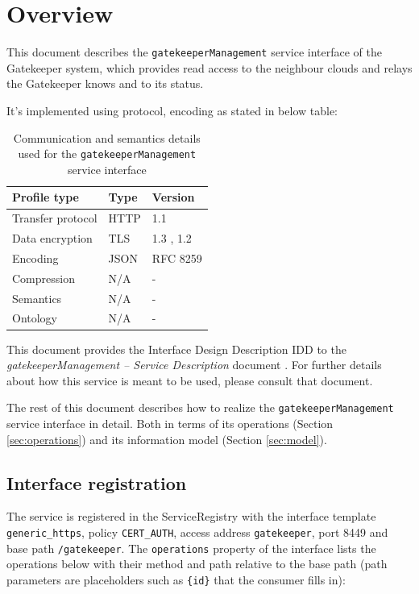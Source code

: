 \documentclass[a4paper]{arrowhead}
\begin{document}
\section{Overview}
\label{sec:overview}

This document describes the \texttt{gatekeeper\allowbreak{}Management} service interface of the Gatekeeper system, which provides read access to the neighbour clouds and relays the Gatekeeper knows and to its status.

It's implemented using protocol, encoding as stated in below table:
\begin{table}[ht!]
  \centering
  \begin{tabular}{|l|l|l|}
    \hline
    \rowcolor{gray!33} Profile type & Type & Version \\ \hline
    Transfer protocol & HTTP & 1.1 \cite{rfc9112} \\ \hline
    Data encryption & TLS & 1.3 \cite{rfc8446}, 1.2 \cite{rfc5246} \\ \hline
    Encoding & JSON & RFC 8259 \cite{rfc8259} \\ \hline
    Compression & N/A & - \\ \hline
    Semantics & N/A & - \\ \hline
    Ontology & N/A & - \\ \hline
  \end{tabular}
  \caption{Communication and semantics details used for the \texttt{gatekeeper\allowbreak{}Management} service interface}
  \label{tab:comunication_semantics_profile}
\end{table}

This document provides the Interface Design Description IDD to the \textit{gatekeeperManagement -- Service Description} document \cite{gk-gatekeeperManagement-sd}.
For further details about how this service is meant to be used, please consult that document.

The rest of this document describes how to realize the \texttt{gatekeeper\allowbreak{}Management} service
interface in detail. Both in terms of its operations (Section \ref{sec:operations}) and its information model (Section \ref{sec:model}).

\subsection{Interface registration}

The service is registered in the ServiceRegistry with the interface template \texttt{generic\_\allowbreak{}https}, policy \texttt{CERT\_\allowbreak{}AUTH}, access address \texttt{gatekeeper}, port 8449 and base path \texttt{/\allowbreak{}gatekeeper}. The \texttt{operations} property of the interface lists the operations below with their method and path relative to the base path (path parameters are placeholders such as \texttt{\{id\}} that the consumer fills in):
\end{document}
